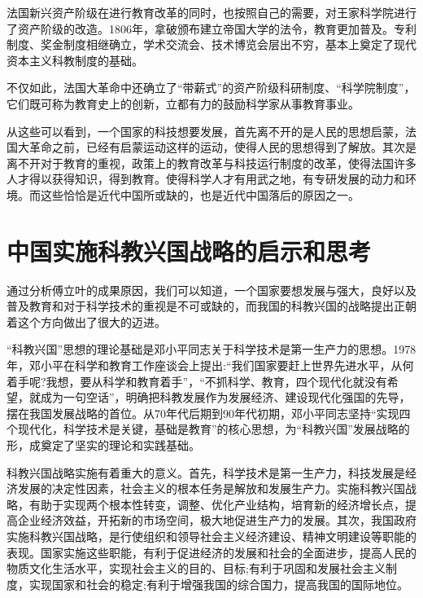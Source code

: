 \documentclass{../source/Paper}
\begin{document}
法国新兴资产阶级在进⾏教育改⾰的同时，也按照⾃⼰的需要，对王家科学院进⾏了资产阶级的改造。1806年，拿破颁布建⽴帝国⼤学的法令，教育更加普及。专利制度、奖⾦制度相继确⽴，学术交流会、技术博览会层出不穷，基本上奠定了现代资本主义科教制度的基础。

不仅如此，法国⼤⾰命中还确⽴了“带薪式”的资产阶级科研制度、“科学院制度”，它们既可称为教育史上的创新，⽴都有⼒的⿎励科学家从事教育事业。

从这些可以看到，一个国家的科技想要发展，首先离不开的是人民的思想启蒙，法国大革命之前，已经有启蒙运动这样的运动，使得人民的思想得到了解放。其次是离不开对于教育的重视，政策上的教育改革与科技运行制度的改革，使得法国许多人才得以获得知识，得到教育。使得科学人才有用武之地，有专研发展的动力和环境。而这些恰恰是近代中国所或缺的，也是近代中国落后的原因之一。


\section{中国实施科教兴国战略的启示和思考}

通过分析傅立叶的成果原因，我们可以知道，一个国家要想发展与强大，良好以及普及教育和对于科学技术的重视是不可或缺的，而我国的科教兴国的战略提出正朝着这个方向做出了很大的迈进。

“科教兴国”思想的理论基础是邓小平同志关于科学技术是第一生产力的思想。1978年，邓小平在科学和教育工作座谈会上提出:“我们国家要赶上世界先进水平，从何着手呢?我想，要从科学和教育着手”，“不抓科学、教育，四个现代化就没有希望，就成为一句空话”，明确把科教发展作为发展经济、建设现代化强国的先导，摆在我国发展战略的首位。从70年代后期到90年代初期，邓小平同志坚持“实现四个现代化，科学技术是关键，基础是教育”的核心思想，为“科教兴国”发展战略的形，成奠定了坚实的理论和实践基础。

科教兴国战略实施有着重大的意义。首先，科学技术是第一生产力，科技发展是经济发展的决定性因素，社会主义的根本任务是解放和发展生产力。实施科教兴国战略，有助于实现两个根本性转变，调整、优化产业结构，培育新的经济增长点，提高企业经济效益，开拓新的市场空间，极大地促进生产力的发展。其次，我国政府实施科教兴国战略，是行使组织和领导社会主义经济建设、精神文明建设等职能的表现。国家实施这些职能，有利于促进经济的发展和社会的全面进步，提高人民的物质文化生活水平，实现社会主义的目的、目标;有利于巩固和发展社会主义制度，实现国家和社会的稳定;有利于增强我国的综合国力，提高我国的国际地位。
\end{document}
